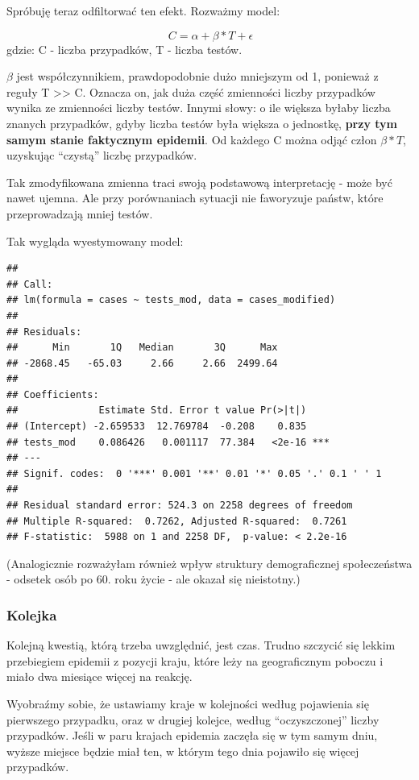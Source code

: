 \documentclass[
]{article}
\begin{document}
Spróbuję teraz odfiltorwać ten efekt. Rozważmy model:

\[\ C = \alpha + \beta * T + \epsilon \] gdzie: C - liczba przypadków, T
- liczba testów.

\(\beta\) jest współczynnikiem, prawdopodobnie dużo mniejszym od 1,
ponieważ z reguły T \textgreater\textgreater{} C. Oznacza on, jak duża
część zmienności liczby przypadków wynika ze zmienności liczby testów.
Innymi słowy: o ile większa byłaby liczba znanych przypadków, gdyby
liczba testów była większa o jednostkę, \textbf{przy tym samym stanie
faktycznym epidemii}. Od każdego C można odjąć człon \(\beta * T\),
uzyskując ``czystą'' liczbę przypadków.

Tak zmodyfikowana zmienna traci swoją podstawową interpretację - może
być nawet ujemna. Ale przy porównaniach sytuacji nie faworyzuje państw,
które przeprowadzają mniej testów.

Tak wygląda wyestymowany model:

\begin{verbatim}
## 
## Call:
## lm(formula = cases ~ tests_mod, data = cases_modified)
## 
## Residuals:
##      Min       1Q   Median       3Q      Max 
## -2868.45   -65.03     2.66     2.66  2499.64 
## 
## Coefficients:
##              Estimate Std. Error t value Pr(>|t|)    
## (Intercept) -2.659533  12.769784  -0.208    0.835    
## tests_mod    0.086426   0.001117  77.384   <2e-16 ***
## ---
## Signif. codes:  0 '***' 0.001 '**' 0.01 '*' 0.05 '.' 0.1 ' ' 1
## 
## Residual standard error: 524.3 on 2258 degrees of freedom
## Multiple R-squared:  0.7262, Adjusted R-squared:  0.7261 
## F-statistic:  5988 on 1 and 2258 DF,  p-value: < 2.2e-16
\end{verbatim}

(Analogicznie rozważyłam również wpływ struktury demograficznej
społeczeństwa - odsetek osób po 60. roku życie - ale okazał się
nieistotny.)

\hypertarget{kolejka}{%
\subsubsection{Kolejka}\label{kolejka}}

Kolejną kwestią, którą trzeba uwzględnić, jest czas. Trudno szczycić się
lekkim przebiegiem epidemii z pozycji kraju, które leży na geograficznym
poboczu i miało dwa miesiące więcej na reakcję.

Wyobraźmy sobie, że ustawiamy kraje w kolejności według pojawienia się
pierwszego przypadku, oraz w drugiej kolejce, według ``oczyszczonej''
liczby przypadków. Jeśli w paru krajach epidemia zaczęła się w tym samym
dniu, wyższe miejsce będzie miał ten, w którym tego dnia pojawiło się
więcej przypadków.
\end{document}
